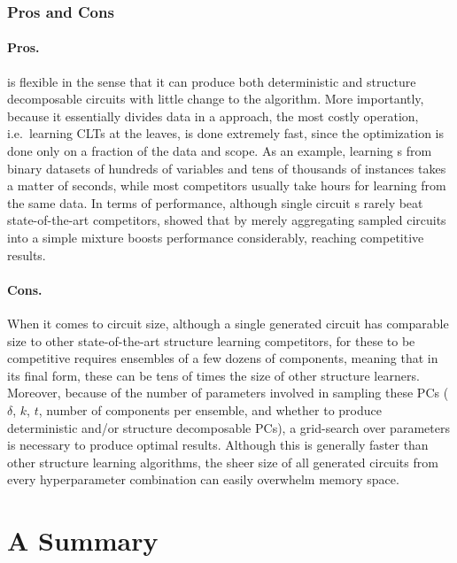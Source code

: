\subsubsection{Pros and Cons}

\paragraph{Pros.}  is flexible in the sense that it can produce both deterministic
and structure decomposable circuits with little change to the algorithm. More importantly, because
it essentially divides data in a \divclass{} approach, the most costly operation, i.e.\ learning
CLTs at the leaves, is done extremely fast, since the optimization is done only on a fraction of
the data and scope. As an example, learning s from binary datasets of hundreds of
variables and tens of thousands of instances takes a matter of seconds, while most competitors
usually take hours for learning from the same data. In terms of performance, although single
circuit s rarely beat state-of-the-art competitors, \citet{dimauro21} showed that by
merely aggregating sampled circuits into a simple mixture boosts performance considerably, reaching
competitive results.

\paragraph{Cons.} When it comes to circuit size, although a single  generated circuit
has comparable size to other state-of-the-art structure learning competitors, for these to be
competitive requires ensembles of a few dozens of components, meaning that in its final form, these
can be tens of times the size of other structure learners. Moreover, because of the number of
parameters involved in sampling these PCs ($\delta$, $k$, $t$, number of components per ensemble,
and whether to produce deterministic and/or structure decomposable PCs), a grid-search over
parameters is necessary to produce optimal results. Although this is generally faster than other
structure learning algorithms, the sheer size of all generated circuits from every hyperparameter
combination can easily overwhelm memory space.

\section{A Summary}


